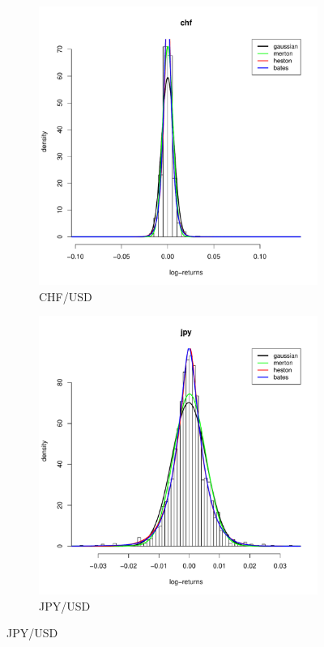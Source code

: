 \begin{figure}
	\small
	\centering
	\begin{subfigure}{0.44\textwidth}
		\centering
		\includegraphics[width=\linewidth]{Images/hist_chf.pdf}
		\caption{CHF/USD}
	\end{subfigure}
	\begin{subfigure}{0.44\textwidth}
		\centering
		\includegraphics[width=\linewidth]{Images/hist_jpy.pdf}
		\caption{JPY/USD}
	\end{subfigure}
	

\end{figure}
